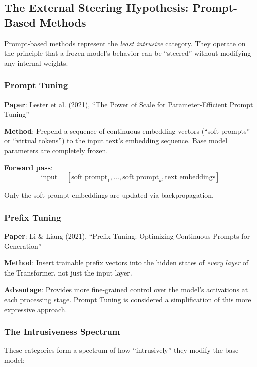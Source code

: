 \documentclass{article}
\begin{document}
\subsection{The External Steering Hypothesis: Prompt-Based Methods}

Prompt-based methods represent the \textit{least intrusive} category. They operate on the principle that a frozen model's behavior can be ``steered'' without modifying any internal weights.

\subsubsection{Prompt Tuning}

\textbf{Paper}: Lester et al. (2021), ``The Power of Scale for Parameter-Efficient Prompt Tuning''

\textbf{Method}: Prepend a sequence of continuous embedding vectors (``soft prompts'' or ``virtual tokens'') to the input text's embedding sequence. Base model parameters are completely frozen.

\textbf{Forward pass}:
\[
\text{input} = [\text{soft\_prompt}_1, \ldots, \text{soft\_prompt}_k, \text{text\_embeddings}]
\]

Only the soft prompt embeddings are updated via backpropagation.

\subsubsection{Prefix Tuning}

\textbf{Paper}: Li \& Liang (2021), ``Prefix-Tuning: Optimizing Continuous Prompts for Generation''

\textbf{Method}: Insert trainable prefix vectors into the hidden states of \textit{every layer} of the Transformer, not just the input layer.

\textbf{Advantage}: Provides more fine-grained control over the model's activations at each processing stage. Prompt Tuning is considered a simplification of this more expressive approach.

\subsubsection{The Intrusiveness Spectrum}

These categories form a spectrum of how ``intrusively'' they modify the base model:

\begin{center}
\end{center}
\end{document}
